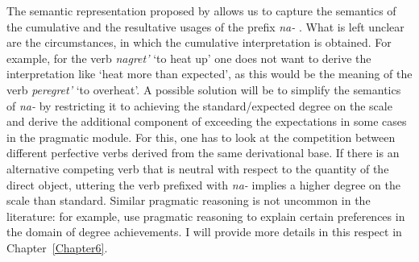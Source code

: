 The semantic representation proposed by \citet{Kagan:book} allows us to capture the semantics of the cumulative  and the resultative  usages of the prefix \textit{na-}  . What is left unclear are the circumstances, in which the cumulative  interpretation is obtained. For example, for the verb \textit{nagret'} `to heat up' one does not want to derive the interpretation like `heat more than expected', as this would be the meaning of the verb \textit{peregret'} `to overheat'. A possible solution will be to simplify the semantics of \textit{na-}   by restricting it to achieving the standard/expected degree on the scale and derive the additional component of exceeding the expectations in some cases in the pragmatic module. For this, one has to look at the competition between different perfective verbs  derived from the same derivational base. If there is an alternative competing verb that is neutral with respect to the quantity of the direct object, uttering the verb prefixed with \textit{na-}   implies a higher degree on the scale than standard. Similar pragmatic reasoning is not uncommon in the literature: for example, \citet[21]{KennedyLevin:08} use pragmatic reasoning to explain certain preferences in the domain of degree achievements. I will provide more details in this respect in Chapter~\ref{Chapter6}.


